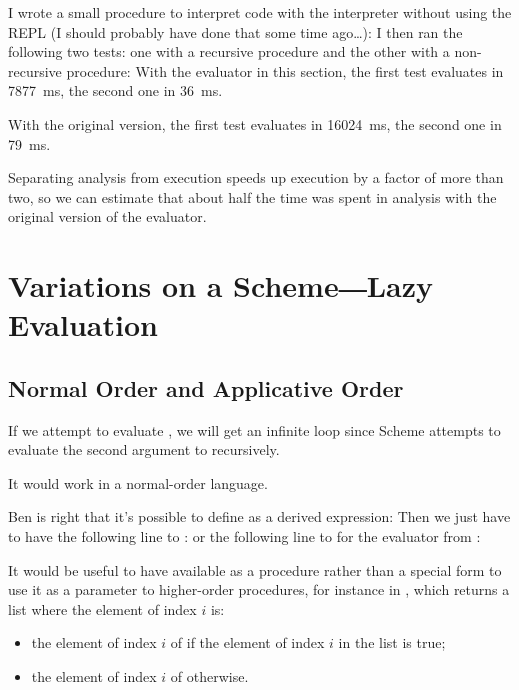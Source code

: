 \begin{exe}[4.24]
    I wrote a small procedure to interpret code with the interpreter without 
    using the REPL (I should probably have done that some time ago…):
    I then ran the following two tests: one with a recursive procedure and the 
    other with a non-recursive procedure:
    With the evaluator in this section, the first test evaluates in 7877~ms, the 
    second one in 36~ms.

    With the original version, the first test evaluates in 16024~ms, the second 
    one in 79~ms.

    Separating analysis from execution speeds up execution by a factor of more 
    than two, so we can estimate that about half the time was spent in analysis 
    with the original version of the evaluator.
\end{exe}

\section{Variations on a Scheme―Lazy Evaluation}

\subsection{Normal Order and Applicative Order}

\begin{exe}[4.25]
    If we attempt to evaluate , we will get an infinite loop 
    since Scheme attempts to evaluate the second argument to  
    recursively.

    It would work in a normal-order language.
\end{exe}

\begin{exe}[4.26]
    Ben is right that it’s possible to define  as a derived 
    expression:
    Then we just have to have the following line to :
    or the following line to  for the evaluator from 
    :

    It would be useful to have  available as a procedure rather 
    than a special form to use it as a parameter to higher-order procedures, for 
    instance in , which returns a list 
    where the element of index $i$ is:
    \begin{itemize}
	\item the element of index $i$ of  if the element of index 
	    $i$ in the list  is true;
	\item the element of index $i$ of  otherwise.
    \end{itemize}
\end{exe}

